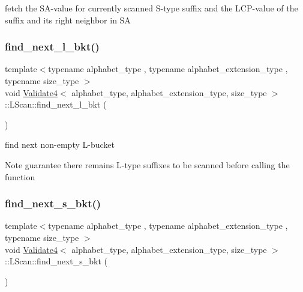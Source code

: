 fetch the S\+A-\/value for currently scanned S-\/type suffix and the L\+C\+P-\/value of the suffix and its right neighbor in SA 

\mbox{\label{struct_validate4_1_1_l_scan_abd7e922317ee9d64d90853adba6a7634}} 
\subsubsection{\texorpdfstring{find\+\_\+next\+\_\+l\+\_\+bkt()}{find\_next\_l\_bkt()}}
{\footnotesize\ttfamily template$<$typename alphabet\+\_\+type , typename alphabet\+\_\+extension\+\_\+type , typename size\+\_\+type $>$ \\
void \hyperlink{class_validate4}{Validate4}$<$ alphabet\+\_\+type, alphabet\+\_\+extension\+\_\+type, size\+\_\+type $>$\+::L\+Scan\+::find\+\_\+next\+\_\+l\+\_\+bkt (\begin{DoxyParamCaption}{ }\end{DoxyParamCaption})\hspace{0.3cm}{\ttfamily [inline]}}



find next non-\/empty L-\/bucket 

\begin{DoxyNote}{Note}
guarantee there remains L-\/type suffixes to be scanned before calling the function 
\end{DoxyNote}
\mbox{\label{struct_validate4_1_1_l_scan_aa570a8ac447950b6b0d9deae2e4cae63}} 
\subsubsection{\texorpdfstring{find\+\_\+next\+\_\+s\+\_\+bkt()}{find\_next\_s\_bkt()}}
{\footnotesize\ttfamily template$<$typename alphabet\+\_\+type , typename alphabet\+\_\+extension\+\_\+type , typename size\+\_\+type $>$ \\
void \hyperlink{class_validate4}{Validate4}$<$ alphabet\+\_\+type, alphabet\+\_\+extension\+\_\+type, size\+\_\+type $>$\+::L\+Scan\+::find\+\_\+next\+\_\+s\+\_\+bkt (\begin{DoxyParamCaption}{ }\end{DoxyParamCaption})\hspace{0.3cm}{\ttfamily [inline]}}



